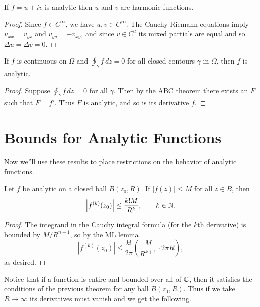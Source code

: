 \documentclass[../m136main.tex]{subfiles}
\begin{document}
\begin{corollary}[]
    If $f = u + iv$ is analytic then $u$ and $v$ are harmonic functions.
\end{corollary}

\begin{proof}
    Since $f \in C^\infty$, we have $u,v \in C^\infty$.
    The Cauchy-Riemann equations imply $u_{xx} = v_{yx}$ and $v_{yy} = -v_{xy}$, and since $v \in C^2$ its mixed partials are equal and so $\Delta u = \Delta v = 0$.
\end{proof}

\pagebreak

\begin{theorem}
    If $f$ is continuous on $\Omega$ and $\oint_\gamma f \,dz = 0$ for all closed contours $\gamma$ in $\Omega$, then $f$ is analytic.
\end{theorem}

\begin{proof}
    Suppose $\oint_\gamma f \,dz = 0$ for all $\gamma$.
    Then by the ABC theorem there exists an $F$ such that $F = f'$.
    Thus $F$ is analytic, and so is its derivative $f$.
\end{proof}

\section{Bounds for Analytic Functions}
Now we''ll use these results to place restrictions on the behavior of analytic functions.

\begin{theorem}
    Let $f$ be analytic on a closed ball $B(z_0, R)$.
    If $|f(z)| \leq M$ for all $z \in B$, then
    \[ \left| f^{(k)}(z_0) \right| \leq \frac{k! M}{R^k}, \qquad k \in \mathbb{N}. \]
\end{theorem}

\begin{proof}
    The integrand in the Cauchy integral formula (for the $k$th derivative) is bounded by $M / R^{n+1}$, so by the ML lemma
    \[ \left| f^{(k)}(z_0) \right| \leq \frac{k!}{2\pi} \left( \frac{M}{R^{k+1}} \cdot 2\pi R \right), \]
    as desired.
\end{proof}

Notice that if a function is entire and bounded over all of $\mathbb{C}$, then it satisfies the conditions of the previous theorem for any ball $B(z_0, R)$.
Thus if we take $R \to \infty$ its derivatives must vanish and we get the following.
\end{document}
